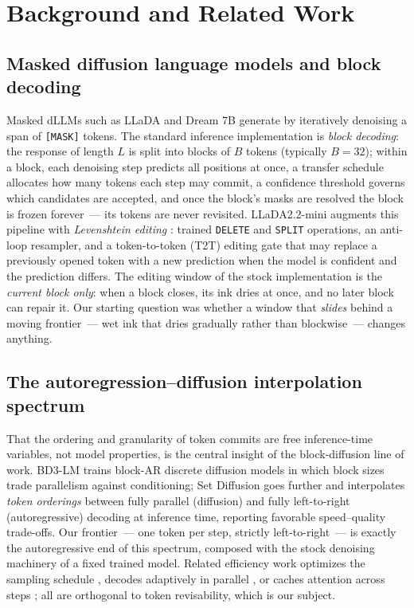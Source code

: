 \section{Background and Related Work}\label{sec:background}

\subsection{Masked diffusion language models and block decoding}
Masked dLLMs such as LLaDA \citep{llada} and Dream 7B \citep{dream7b} generate by
iteratively denoising a span of \texttt{[MASK]} tokens. The standard inference
implementation is \emph{block decoding}: the response of length $L$ is split into
blocks of $B$ tokens (typically $B{=}32$); within a block, each denoising step
predicts all positions at once, a transfer schedule allocates how many tokens each
step may commit, a confidence threshold governs which candidates are accepted, and
once the block's masks are resolved the block is frozen forever~--- its tokens are
never revisited. LLaDA2.2-mini \citep{llada22mini} augments this pipeline with
\emph{Levenshtein editing} \citep{llada21,levt}: trained \texttt{DELETE} and
\texttt{SPLIT} operations, an anti-loop resampler, and a token-to-token (T2T)
editing gate that may replace a previously opened token with a new prediction when
the model is confident and the prediction differs. The editing window of the stock
implementation is the \emph{current block only}: when a block closes, its ink dries
at once, and no later block can repair it. Our starting question was whether a
window that \emph{slides} behind a moving frontier~--- wet ink that dries gradually
rather than blockwise~--- changes anything.

\subsection{The autoregression--diffusion interpolation spectrum}
That the ordering and granularity of token commits are free inference-time
variables, not model properties, is the central insight of the block-diffusion
line of work. BD3-LM \citep{bd3lm} trains block-AR discrete diffusion models in
which block sizes trade parallelism against conditioning; Set Diffusion
\citep{setdiffusion} goes further and interpolates \emph{token orderings} between
fully parallel (diffusion) and fully left-to-right (autoregressive) decoding at
inference time, reporting favorable speed--quality trade-offs. Our frontier~--- one
token per step, strictly left-to-right~--- is exactly the autoregressive end of
this spectrum, composed with the stock denoising machinery of a fixed trained
model. Related efficiency work optimizes the sampling schedule \citep{jys},
decodes adaptively in parallel \citep{apd}, or caches attention across steps
\citep{fastdllm}; all are orthogonal to token revisability, which is our subject.

